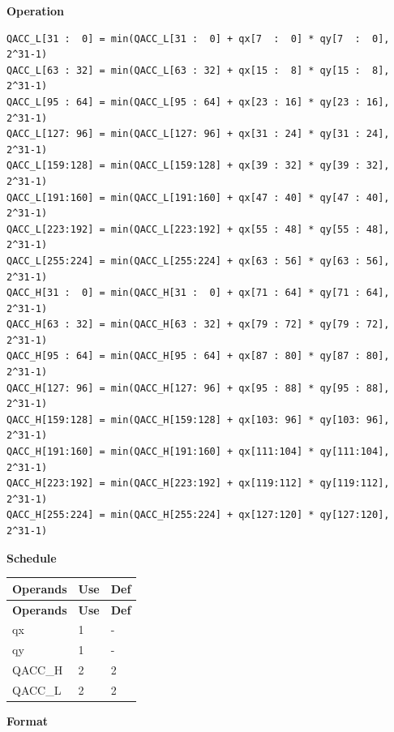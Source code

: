 \textbf{Operation}\\

\begin{lstlisting}
QACC_L[31 :  0] = min(QACC_L[31 :  0] + qx[7  :  0] * qy[7  :  0], 2^31-1)
QACC_L[63 : 32] = min(QACC_L[63 : 32] + qx[15 :  8] * qy[15 :  8], 2^31-1)
QACC_L[95 : 64] = min(QACC_L[95 : 64] + qx[23 : 16] * qy[23 : 16], 2^31-1)
QACC_L[127: 96] = min(QACC_L[127: 96] + qx[31 : 24] * qy[31 : 24], 2^31-1)
QACC_L[159:128] = min(QACC_L[159:128] + qx[39 : 32] * qy[39 : 32], 2^31-1)
QACC_L[191:160] = min(QACC_L[191:160] + qx[47 : 40] * qy[47 : 40], 2^31-1)
QACC_L[223:192] = min(QACC_L[223:192] + qx[55 : 48] * qy[55 : 48], 2^31-1)
QACC_L[255:224] = min(QACC_L[255:224] + qx[63 : 56] * qy[63 : 56], 2^31-1)
QACC_H[31 :  0] = min(QACC_H[31 :  0] + qx[71 : 64] * qy[71 : 64], 2^31-1)
QACC_H[63 : 32] = min(QACC_H[63 : 32] + qx[79 : 72] * qy[79 : 72], 2^31-1)
QACC_H[95 : 64] = min(QACC_H[95 : 64] + qx[87 : 80] * qy[87 : 80], 2^31-1)
QACC_H[127: 96] = min(QACC_H[127: 96] + qx[95 : 88] * qy[95 : 88], 2^31-1)
QACC_H[159:128] = min(QACC_H[159:128] + qx[103: 96] * qy[103: 96], 2^31-1)
QACC_H[191:160] = min(QACC_H[191:160] + qx[111:104] * qy[111:104], 2^31-1)
QACC_H[223:192] = min(QACC_H[223:192] + qx[119:112] * qy[119:112], 2^31-1)
QACC_H[255:224] = min(QACC_H[255:224] + qx[127:120] * qy[127:120], 2^31-1)

\end{lstlisting}

\textbf{Schedule}\\
\begin{longtable}[c]{|l|l|l|}
    \hline
    \rowcolor{lightgray}
    \textbf{Operands} & \textbf{Use} & \textbf{Def} \\\hline
    \endfirsthead
    \hline
    \rowcolor{lightgray}
     \textbf{Operands} & \textbf{Use} & \textbf{Def} \\\hline
    \endhead
    \hline
    \endfoot

     qx & 1 & - \\\hline
     qy & 1 & - \\\hline
     QACC\_H & 2 & 2 \\\hline
     QACC\_L & 2 & 2

\end{longtable}

\textbf{Format}\\

